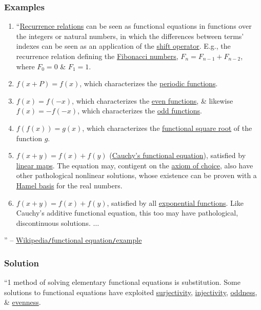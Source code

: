 \documentclass{article}
\begin{document}
\subsubsection{Examples}

\begin{enumerate}
	\item ``\href{https://en.wikipedia.org/wiki/Recurrence_relation}{Recurrence relations} can be seen as functional equations in functions over the integers or natural numbers, in which the differences between terms' indexes can be seen as an application of the \href{https://en.wikipedia.org/wiki/Shift_operator}{shift operator}. E.g., the recurrence relation defining the \href{https://en.wikipedia.org/wiki/Fibonacci_numbers}{Fibonacci numbers}, $F_n = F_{n-1} + F_{n-2}$, where $F_0 = 0$ \& $F_1 = 1$.
	\item $f(x + P) = f(x)$, which characterizes the \href{https://en.wikipedia.org/wiki/Periodic_function}{periodic functions}.
	\item $f(x) = f(-x)$, which characterizes the \href{https://en.wikipedia.org/wiki/Even_function}{even functions}, \& likewise $f(x) = -f(-x)$, which characterizes the \href{https://en.wikipedia.org/wiki/Odd_function}{odd functions}.
	\item $f(f(x)) = g(x)$, which characterizes the \href{https://en.wikipedia.org/wiki/Functional_square_root}{functional square root} of the function $g$.
	\item $f(x + y) = f(x) + f(y)$ (\href{https://en.wikipedia.org/wiki/Cauchy%27s_functional_equation}{Cauchy's functional equation}), satisfied by \href{https://en.wikipedia.org/wiki/Linear_map}{linear maps}. The equation may, contigent on the \href{https://en.wikipedia.org/wiki/Axiom_of_choice}{axiom of choice}, also have other pathological nonlinear solutions, whose existence can be proven with a \href{https://en.wikipedia.org/wiki/Hamel_basis}{Hamel basis} for the real numbers.
	\item $f(x + y) = f(x) + f(y)$, satisfied by all \href{https://en.wikipedia.org/wiki/Exponential_function}{exponential functions}. Like Cauchy's additive functional equation, this too may have pathological, discontinuous solutions. $\ldots$
\end{enumerate}
'' -- \href{https://en.wikipedia.org/wiki/Functional_equation#Examples}{Wikipedia\texttt{/}functional equation\texttt{/}example}

\subsubsection{Solution}
``1 method of solving elementary functional equations is substitution. Some solutions to functional equations have exploited \href{https://en.wikipedia.org/wiki/Surjective}{surjectivity}, \href{https://en.wikipedia.org/wiki/Injective_function}{injectivity}, \href{https://en.wikipedia.org/wiki/Odd_function}{oddness}, \& \href{https://en.wikipedia.org/wiki/Even_function}{evenness}.
\end{document}
